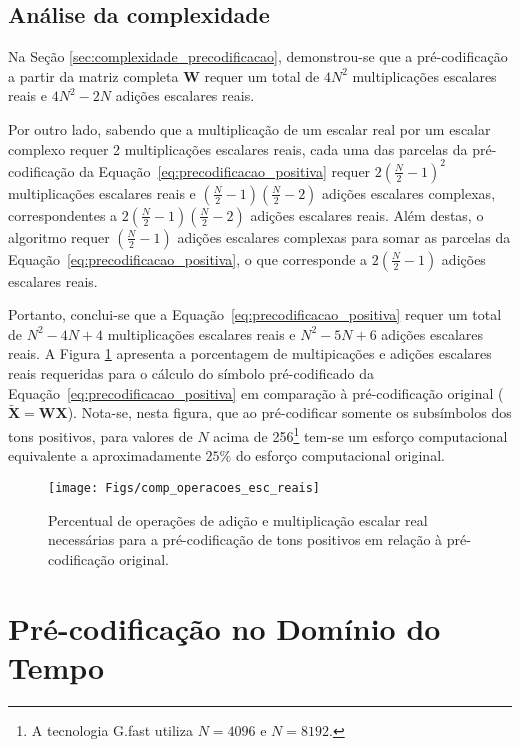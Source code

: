 \subsection{Análise da complexidade}

Na Seção \ref{sec:complexidade_precodificacao}, demonstrou-se que a pré-codificação a partir da matriz completa $\mathbf{W}$ requer um total de $4N^2$ multiplicações escalares reais e  $4N^2 - 2N$ adições escalares reais. 

Por outro lado, sabendo que a multiplicação de um escalar real por um escalar complexo requer 2 multiplicações escalares reais, cada uma das parcelas da pré-codificação da Equação~\ref{eq:precodificacao_positiva} requer $2(\frac{N}{2} -1)^2$ multiplicações escalares reais e $(\frac{N}{2} -1)(\frac{N}{2} -2)$ adições escalares complexas, correspondentes a $2(\frac{N}{2} -1)(\frac{N}{2} -2)$ adições escalares reais. Além destas, o algoritmo requer $(\frac{N}{2} -1)$ adições escalares complexas para somar as parcelas da Equação~\ref{eq:precodificacao_positiva}, o que corresponde a $2(\frac{N}{2} -1)$  adições escalares reais.

Portanto, conclui-se que a Equação~\ref{eq:precodificacao_positiva} requer um total de $N^2 - 4N + 4$ multiplicações escalares reais e $N^2 - 5N + 6$ adições escalares reais. A Figura \ref{fig:comp_operacoes_esc_reais} apresenta a porcentagem de multipicações e adições escalares reais requeridas para o cálculo do símbolo pré-codificado da Equação~\ref{eq:precodificacao_positiva} em comparação à pré-codificação original ($\tilde{\mathbf{X}} = \mathbf{WX}$). Nota-se, nesta figura, que ao pré-codificar somente os subsímbolos dos tons positivos, para valores de $N$ acima de 256\footnote{A tecnologia G.fast utiliza $N=4096$ e $N=8192$.} tem-se um esforço computacional equivalente a aproximadamente $25 \% $ do esforço computacional original.

\begin{figure}[htbp]
\centering
\texttt{[image: Figs/comp\_operacoes\_esc\_reais]}
\caption{ Percentual de operações de adição e multiplicação escalar real necessárias para a pré-codificação de tons positivos em relação à pré-codificação original.  \label{fig:comp_operacoes_esc_reais}}
\end{figure}

\section{Pré-codificação no Domínio do Tempo}
\label{sec:prec_time_domain}

